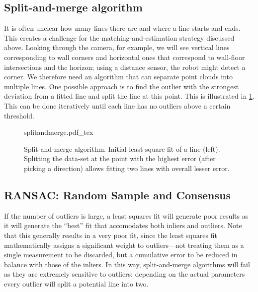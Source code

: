 \subsection{Split-and-merge algorithm}
It is often unclear how many lines there are and where a line starts and ends. This creates a challenge for the matching-and-estimation strategy discussed above. Looking through the camera, for example, we will see vertical lines corresponding to wall corners and horizontal ones that correspond to wall-floor intersections and the horizon; using a distance sensor, the robot might detect a corner. We therefore need an algorithm that can separate point clouds into multiple lines. One possible approach is to find the outlier with the strongest deviation from a fitted line and split the line at this point. This is illustrated in \cref{fig:splitandmerge}. This can be done iteratively until each line has no outliers above a certain threshold.

\begin{figure}
    \def\svgwidth{\textwidth}
    {splitandmerge.pdf_tex}
    \caption{Split-and-merge algorithm. Initial least-square fit of a line (left). Splitting the data-set at the point with the highest error (after picking a direction) allows fitting two lines with overall lesser error.\label{fig:splitandmerge}}
\end{figure}

\subsection{RANSAC: Random Sample and Consensus}
If the number of outliers is large, a least squares fit will generate poor results as it will generate the ``best'' fit that accomodates both inliers and outliers. Note that this generally results in a very poor fit, since the least squares fit mathematically assigns a significant weight to outliers---not treating them as a single measurement to be discarded, but a cumulative error to be reduced in balance with those of the inliers. In this way, split-and-merge algorithms will fail as they are extremely sensitive to outliers: depending on the actual parameters every outlier will split a potential line into two.

